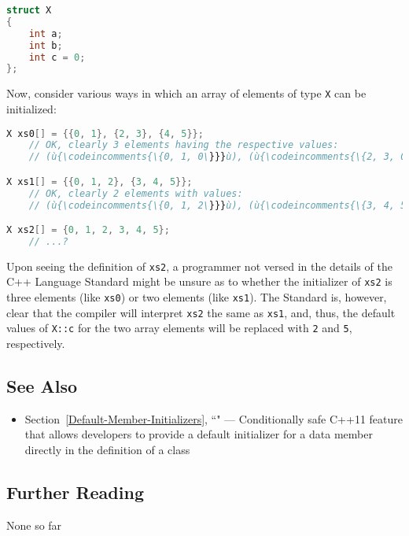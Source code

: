 \begin{lstlisting}[language=C++]
struct X
{
    int a;
    int b;
    int c = 0;
};
\end{lstlisting}
    
\noindent Now, consider various ways in which an array of elements of type
\texttt{X} can be initialized:

\begin{lstlisting}[language=C++]
X xs0[] = {{0, 1}, {2, 3}, {4, 5}};
    // OK, clearly 3 elements having the respective values:
    // (ù{\codeincomments{\{0, 1, 0\}}}ù), (ù{\codeincomments{\{2, 3, 0\}}}ù), (ù{\codeincomments{\{4, 5, 0\}}}ù)

X xs1[] = {{0, 1, 2}, {3, 4, 5}};
    // OK, clearly 2 elements with values:
    // (ù{\codeincomments{\{0, 1, 2\}}}ù), (ù{\codeincomments{\{3, 4, 5\}}}ù)

X xs2[] = {0, 1, 2, 3, 4, 5};
    // ...?
\end{lstlisting}
    
\noindent Upon seeing the definition of \texttt{xs2}, a programmer not versed in
the details of the C++ Language Standard might be unsure as to whether the
initializer of \texttt{xs2} is three elements (like \texttt{xs0}) or two
elements (like \texttt{xs1}). The Standard is, however, clear that the
compiler will interpret \texttt{xs2} the same as \texttt{xs1}, and,
thus, the default values of \texttt{X::c} for the two array elements
will be replaced with \texttt{2} and \texttt{5}, respectively.

\subsection[See Also]{See Also}\label{see-also}

\begin{itemize}
\item{Section~\ref{Default-Member-Initializers}, ``" — Conditionally safe C++11 feature that allows developers to provide a default initializer for a data member directly in the definition of a class}
\end{itemize}

\subsection[Further Reading]{Further Reading}\label{further-reading}

None so far

